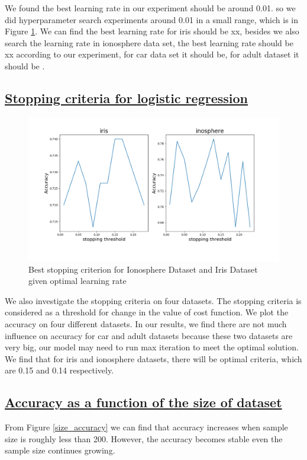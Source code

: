 \documentclass[11pt]{scrartcl}
\begin{document}
We found the best learning rate in our experiment should be around 0.01. so we did hyperparameter search experiments around 0.01 in a small range, which is in Figure \ref{stopping_cri_lr}. We can find the best learning rate for iris should be xx, besides we also search the learning rate in ionosphere data set, the best learning rate should be xx according to our experiment, for car data set it should be, for adult dataset it should be .



\subsection*{\underline{Stopping criteria for logistic regression}}

\begin{figure}[htbp]
	\centering
	\includegraphics[width=0.8\linewidth]{fig/stopping-threshold.png}
	\caption{Best stopping criterion for Ionosphere Dataset and Iris Dataset given optimal learning rate}
	\label{stopping_cri_lr}
\end{figure}
We also investigate the stopping criteria on four datasets. The stopping criteria is considered as a threshold for change in the value of cost function. We plot the accuracy on four different datasets. In our results, we find there are not much influence on accuracy for car and adult datasets because these two datasets are very big, our model may need to run max iteration to meet the optimal solution. We find that for iris and ionosphere datasets, there will be optimal criteria, which are 0.15 and 0.14 respectively.
\subsection*{\underline{Accuracy as a function of the size of dataset}}

From Figure \ref{size_accuracy} we can find that accuracy increases when sample size is roughly less than 200. However, the accuracy becomes stable even the sample size continues growing. 
\end{document}
